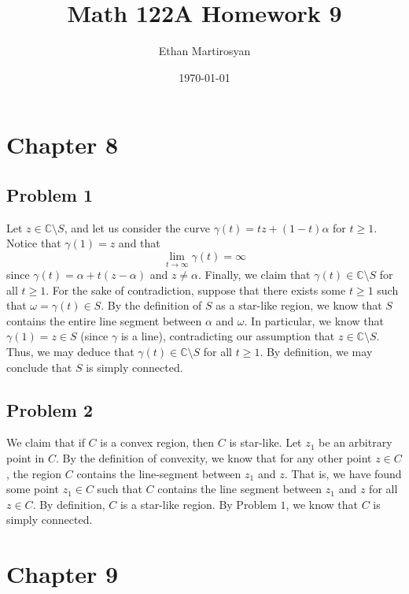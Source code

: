 \documentclass[12pt]{article}
\newcommand{\cc}{{\mathbb C}}
\begin{document}
 
\title{Math 122A Homework 9}
\author{Ethan Martirosyan}
\date{\today}
\maketitle
{}
\hfuzz=50pt
\section*{Chapter 8}
\subsection*{Problem 1}
Let $z \in \cc \setminus S$, and let us consider the curve $\gamma(t) = tz + (1-t)\alpha$ for $t \geq 1$. Notice that $\gamma(1) = z$ and that 
\[
\lim_{t\rightarrow \infty} \gamma(t) = \infty
\] since $\gamma(t) = \alpha + t(z-\alpha)$ and $z \neq \alpha$. Finally, we claim that $\gamma(t) \in \cc \setminus S$ for all $t \geq 1$. For the sake of contradiction, suppose that there exists some $t\geq 1$ such that $\omega = \gamma(t) \in S$. By the definition of $S$ as a star-like region, we know that $S$ contains the entire line segment between $\alpha$ and $\omega$. In particular, we know that $\gamma(1) = z \in S$ (since $\gamma$ is a line), contradicting our assumption that $z \in \cc \setminus S$. Thus, we may deduce that $\gamma(t) \in \cc \setminus S$ for all $t \geq 1$. By definition, we may conclude that $S$ is simply connected.
\newpage
\subsection*{Problem 2}
We claim that if $C$ is a convex region, then $C$ is star-like. Let $z_1$ be an arbitrary point in $C$. By the definition of convexity, we know that for any other point $z \in C$, the region $C$ contains the line-segment between $z_1$ and $z$. That is, we have found some point $z_1 \in C$ such that $C$ contains the line segment between $z_1$ and $z$ for all $z \in C$. By definition, $C$ is a star-like region. By Problem $1$, we know that $C$ is simply connected.
\newpage
\section*{Chapter 9}
\end{document}
